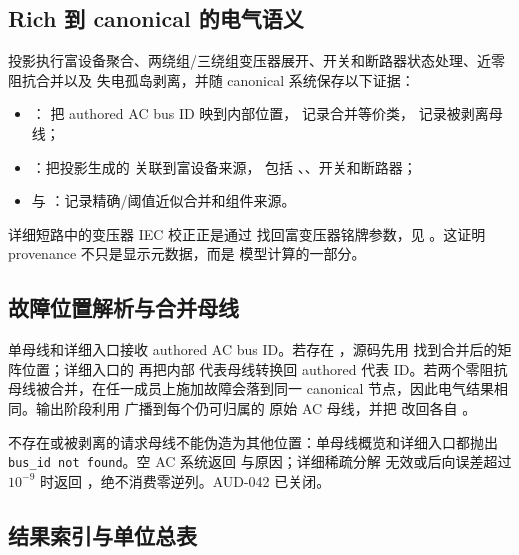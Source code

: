 \subsection{Rich 到 canonical 的电气语义}

投影执行富设备聚合、两绕组/三绕组变压器展开、开关和断路器状态处理、近零阻抗合并以及
失电孤岛剥离，并随 canonical 系统保存以下证据：
\begin{itemize}
  \item {}： 把 authored AC bus ID 映到内部位置，
         记录合并等价类， 记录被剥离母线；
  \item {}：把投影生成的  关联到富设备来源，
        包括 、、开关和断路器；
  \item {} 与 ：记录精确/阈值近似合并和组件来源。
\end{itemize}
详细短路中的变压器 IEC 校正正是通过  找回富变压器铭牌参数，见
。这证明 provenance 不只是显示元数据，而是
模型计算的一部分。

\subsection{故障位置解析与合并母线}

单母线和详细入口接收 authored AC bus ID。若存在 ，源码先用
 找到合并后的矩阵位置；详细入口的  再把内部
代表母线转换回 authored 代表 ID。若两个零阻抗母线被合并，在任一成员上施加故障会落到同一
canonical 节点，因此电气结果相同。输出阶段利用
 广播到每个仍可归属的
原始 AC 母线，并把  改回各自 。

不存在或被剥离的请求母线不能伪造为其他位置：单母线概览和详细入口都抛出
\texttt{bus\_id not found}。空 AC 系统返回  与原因；详细稀疏分解
无效或后向误差超过 $10^{-9}$ 时返回 ，绝不消费零逆列。AUD-042 已关闭。

\subsection{结果索引与单位总表}

